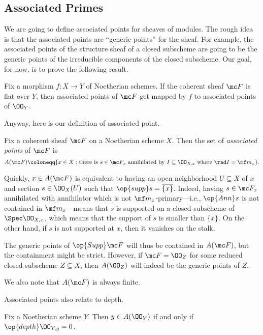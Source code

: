 \documentclass[../notes.tex]{subfiles}
\begin{document}
\subsection{Associated Primes}
We are going to define associated points for sheaves of modules. The rough idea is that the associated points are ``generic points'' for the sheaf. For example, the associated points of the structure sheaf of a closed subscheme are going to be the generic points of the irreducible components of the closed subscheme. Our goal, for now, is to prove the following result.
\begin{proposition}
	Fix a morphism $f\colon X\to Y$ of Noetherian schemes. If the coherent sheaf $\mc F$ is flat over $Y$, then associated points of $\mc F$ get mapped by $f$ to associated points of $\OO_Y$.
\end{proposition}
Anyway, here is our definition of associated point.
\begin{definition}
	Fix a coherent sheaf $\mc F$ on a Noetherian scheme $X$. Then the set of \textit{associated points} of $\mc F$ is
	\[A(\mc F)\coloneqq\{x\in X:\text{there is }s\in\mc F_x\text{ annihilated by }I\subseteq\OO_{X,x}\text{ where }\rad I=\mf m_x\}.\]
\end{definition}
\begin{remark}
	Quickly, $x\in A(\mc F)$ is equivalent to having an open neighborhood $U\subseteq X$ of $x$ and section $s\in\OO_X(U)$ such that $\op{supp}s=\overline{\{x\}}$. Indeed, having $s\in\mc F_x$ annihilated with annihilator which is not $\mf m_x$-primary---i.e., $\op{Ann}s$ is not contained in $\mf m_x$---means that $s$ is supported on a closed subscheme of $\Spec\OO_{X,x}$, which means that the support of $s$ is smaller than $\overline{\{x\}}$. On the other hand, if $s$ is not supported at $x$, then it vanishes on the stalk.
\end{remark}
\begin{remark}
	The generic points of $\op{Supp}\mc F$ will thus be contained in $A(\mc F)$, but the containment might be strict. However, if $\mc F=\OO_Z$ for some reduced closed subscheme $Z\subseteq X$, then $A(\OO_Z)$ will indeed be the generic points of $Z$.
\end{remark}
\begin{remark}
	We also note that $A(\mc F)$ is always finite.
\end{remark}
Associated points also relate to depth.
\begin{lemma}
	Fix a Noetherian scheme $Y$. Then $y\in A(\OO_Y)$ if and only if $\op{depth}\OO_{Y,y}=0$.
\end{lemma}
\end{document}
